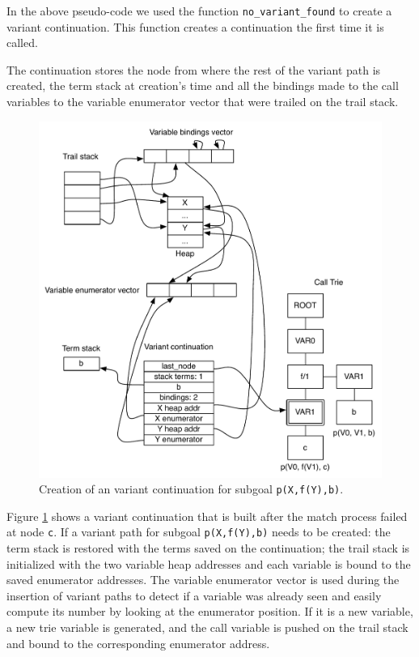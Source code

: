 In the above pseudo-code we used the function \texttt{no\_variant\_found} to create
a variant continuation. This function creates a continuation the first time it is called.

The continuation stores the node from where the rest of the variant path is created,
the term stack at creation's time and all the bindings made to the call variables
to the variable enumerator vector that were trailed on the trail stack.

\begin{figure}[ht]
  \centering
    \includegraphics[scale=0.6]{variant_continuation.pdf}
  \caption{Creation of an variant continuation for subgoal \texttt{p(X,f(Y),b)}.}
  \label{fig:variant_continuation}
\end{figure}

Figure \ref{fig:variant_continuation} shows a variant continuation that is built
after the match process failed at node \texttt{c}. If a variant path
for subgoal \texttt{p(X,f(Y),b)} needs to be created: the term stack is restored
with the terms saved on the continuation; the trail stack is initialized with
the two variable heap addresses and each variable is bound to the saved
enumerator addresses. The variable enumerator vector is used during the insertion
of variant paths to detect if a variable was already seen and easily compute its number by
looking at the enumerator position. If it is a new variable, a new trie variable is generated,
and the call variable is pushed on the trail stack and bound to the corresponding enumerator address. 

